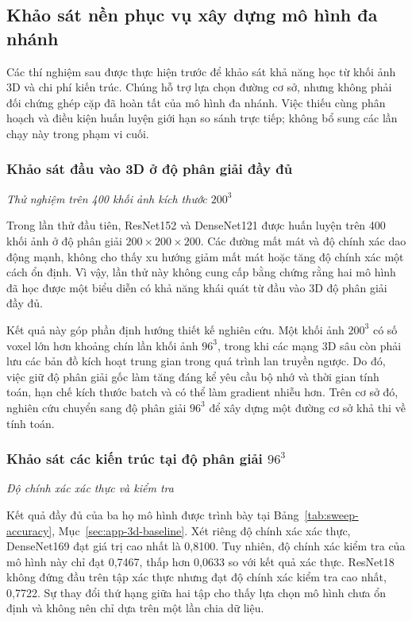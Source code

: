 \documentclass[14pt,a4paper,oneside]{extreport}
\newcommand{\mucthu}[1]{%
  \par\addvspace{10pt}\noindent
  \textit{#1}\nopagebreak\par\nopagebreak
}
\begin{document}
\subsection{Khảo sát nền phục vụ xây dựng mô hình đa nhánh}
\label{sec:baseline-results}
Các thí nghiệm sau được thực hiện trước để khảo sát khả năng học
từ khối ảnh 3D và chi phí kiến trúc. Chúng hỗ trợ lựa chọn đường
cơ sở, nhưng không phải đối chứng ghép cặp đã hoàn tất của mô hình
đa nhánh. Việc thiếu cùng phân hoạch và điều kiện huấn luyện giới hạn
so sánh trực tiếp; không bổ sung các lần chạy này trong phạm vi cuối.
\subsubsection{Khảo sát đầu vào 3D ở độ phân giải đầy đủ}

\mucthu{Thử nghiệm trên 400 khối ảnh kích thước $200^3$}
Trong lần thử đầu tiên, ResNet152 và DenseNet121 được huấn luyện trên 400 khối ảnh ở độ phân giải $200\times200\times200$. Các đường mất mát và độ chính xác
dao động mạnh, không cho thấy xu hướng giảm mất mát hoặc tăng độ chính
xác một cách ổn định. Vì vậy, lần thử này không cung cấp bằng chứng rằng hai mô
hình đã học được một biểu diễn có khả năng khái quát từ đầu vào 3D độ phân giải
đầy đủ.

Kết quả này góp phần định hướng thiết kế nghiên cứu. Một khối ảnh $200^3$
có số voxel lớn hơn khoảng chín lần khối ảnh $96^3$, trong khi các mạng 3D sâu
còn phải lưu các bản đồ kích hoạt trung gian trong quá trình lan truyền ngược.
Do đó, việc giữ độ phân giải gốc làm tăng đáng kể yêu cầu bộ nhớ và thời gian
tính toán, hạn chế kích thước batch và có thể làm gradient nhiễu hơn. Trên cơ sở
đó, nghiên cứu chuyển sang độ phân giải $96^3$ để xây dựng một đường cơ sở khả
thi về tính toán.

\subsubsection{Khảo sát các kiến trúc tại độ phân giải \texorpdfstring{$96^3$}{96x96x96}}

\mucthu{Độ chính xác xác thực và kiểm tra}
Kết quả đầy đủ của ba họ mô hình được trình bày tại
Bảng~\ref{tab:sweep-accuracy}, Mục~\ref{sec:app-3d-baseline}.
Xét riêng độ chính xác xác thực, DenseNet169 đạt giá trị cao nhất
là 0,8100. Tuy nhiên, độ
chính xác kiểm tra của mô hình này chỉ đạt 0,7467, thấp hơn 0,0633 so với kết quả
xác thực. ResNet18 không đứng đầu trên tập xác thực nhưng đạt độ chính xác kiểm
tra cao nhất, 0,7722. Sự thay đổi thứ hạng giữa hai tập cho thấy lựa chọn mô hình
chưa ổn định và không nên chỉ dựa trên một lần chia dữ liệu.
\end{document}
